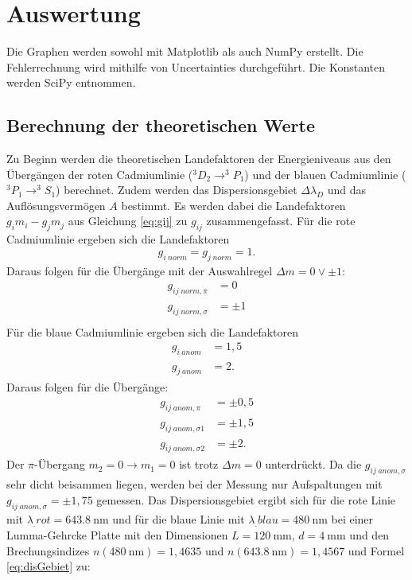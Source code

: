 \section{Auswertung}
\label{sec:Auswertung}

Die Graphen werden sowohl mit Matplotlib \cite{matplotlib} als auch NumPy \cite{numpy} erstellt. Die Fehlerrechnung wird mithilfe von Uncertainties \cite{uncertainties} durchgeführt. Die Konstanten werden SciPy \cite{scipy} entnommen.

\subsection{Berechnung der theoretischen Werte}

Zu Beginn werden die theoretischen Landefaktoren der Energieniveaus aus den Übergängen der roten Cadmiumlinie ($^3D_2 \rightarrow^3P_1$) und der blauen Cadmiumlinie ($^3P_1 \rightarrow^3S_1$) berechnet. 
Zudem werden das Dispersionsgebiet $\Delta\lambda_D$ und das Auflösungsvermögen $A$ bestimmt.
Es werden dabei die Landefaktoren $g_im_i-g_jm_j$ aus Gleichung \ref{eq:gij} zu $g_{ij}$ zusammengefasst.
Für die rote Cadmiumlinie ergeben sich die Landefaktoren
\[
g_{i_.{norm}}=g_{j_.{norm}}=1\text{.}
\]
Daraus folgen für die Übergänge mit der Auswahlregel $\Delta m=0 \lor \pm 1$:
\begin{align*}
g_{ij_.{norm,\pi}}&=0\\
g_{ij_.{norm,\sigma}}&=\pm 1\\
\end{align*}
Für die blaue Cadmiumlinie ergeben sich die Landefaktoren
\begin{align*}
g_{i_.{anom}} &= 1,5\\
g_{j_.{anom}} &= 2 \text{.}
\end{align*}
Daraus folgen für die Übergänge:
\begin{align*}
g_{ij_.{anom,\pi}}&=\pm 0,5\\
g_{ij_.{anom,\sigma1}}&= \pm 1,5\\
g_{ij_.{anom,\sigma2}}&= \pm 2 \text{.}
\end{align*}
Der $\pi$-Übergang $m_2=0\rightarrow m_1=0$ ist trotz $\Delta m=0$ unterdrückt.
Da die $g_{ij_.{anom,\sigma}}$ sehr dicht beisammen liegen, werden bei der Messung nur Aufspaltungen mit $g_{ij_.{anom,\sigma}} = \pm 1,75$ gemessen.
Das Dispersionsgebiet ergibt sich für die rote Linie mit $\lambda_.{rot}=\SI{643.8}{\nano\metre}$ und für die blaue Linie mit $\lambda_.{blau}=\SI{480}{\nano\metre}$ bei einer Lumma-Gehrcke Platte mit den Dimensionen $L=\SI{120}{\milli\metre}$, $d=\SI{4}{\milli\metre}$ und den Brechungsindizes $n(\SI{480}{\nano\metre})=1,4635$ und $n(\SI{643.8}{\nano\metre})=1,4567$ und Formel \eqref{eq:disGebiet} zu:
